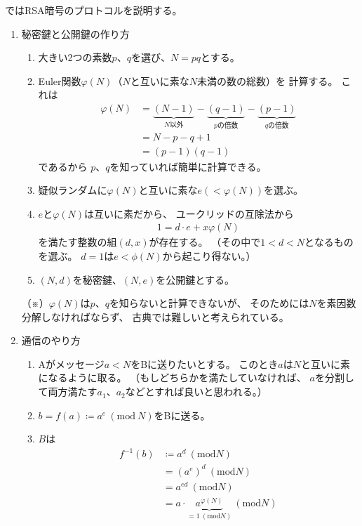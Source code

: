\documentclass[a4paper, 10pt]{jsarticle}
\begin{document}
ではRSA暗号のプロトコルを説明する。
\begin{enumerate}
	\item 秘密鍵と公開鍵の作り方
	\begin{enumerate}
		\item 大きい2つの素数$p$、$q$を選び、$N = pq$とする。
		\item Euler関数$\varphi (N)$（$N$と互いに素な$N$未満の数の総数）を
		計算する。
		これは
		\begin{align}
			\varphi (N) &= \underbrace{(N - 1)}_{\text{$N$以外}}
			- \underbrace{(q - 1)}_{\text{$p$の倍数}}
			- \underbrace{(p - 1)}_{\text{$q$の倍数}} \\
			&= N - p - q + 1 \\
			&= (p - 1)(q - 1)
		\end{align}
		であるから
		$p$、$q$を知っていれば簡単に計算できる。
		\item 疑似ランダムに$\varphi (N)$と互いに素な$e (< \varphi (N))$を選ぶ。
		\item $e$と$\varphi (N)$は互いに素だから、
		ユークリッドの互除法から
		\begin{align}
			1 = d \cdot e + x \varphi (N)
		\end{align}
		を満たす整数の組$(d, x)$が存在する。
		（その中で$1 < d < N$となるものを選ぶ。
		$d = 1$は$e < \phi (N)$から起こり得ない。）
		\item $(N, d)$を秘密鍵、$(N, e)$を公開鍵とする。
	\end{enumerate}
	（※）$\varphi (N)$は$p$、$q$を知らないと計算できないが、
	そのためには$N$を素因数分解しなければならず、
	古典では難しいと考えられている。
	\item 通信のやり方
	\begin{enumerate}
		\item Aがメッセージ$a < N$をBに送りたいとする。
		このとき$a$は$N$と互いに素になるように取る。
		（もしどちらかを満たしていなければ、
		$a$を分割して両方満たす$a_1$、$a_2$などとすれば良いと思われる。）
		\item $b = f(a) \coloneqq a^e \ (\mathrm{mod} \ N)$をBに送る。
		\item $B$は
		\begin{align}
			f^{-1} (b) &\coloneqq a^d \ (\mathrm{mod} N) \\
			&= \left( a^e \right)^d \ (\mathrm{mod} N) \\
			&= a^{ed} \ (\mathrm{mod} N) \\
			&= a \cdot \underbrace{a^{\varphi (N)}}_{= 1  \ (\mathrm{mod} N)}
			\ (\mathrm{mod} N) \\

\end{align}
\end{enumerate}
\end{enumerate}
\end{document}
